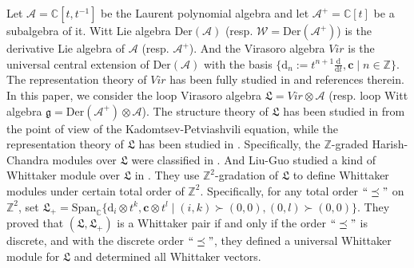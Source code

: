 \documentclass[12pt, a4paper]{amsart}
\newcommand{\C}{\mathbb{C}}
\newcommand{\Z}{\mathbb Z}
\newcommand{\rd}{\mathrm{d}}
\theoremstyle{Theorem}
\theoremstyle{Theorem}
\numberwithin{equation}{section}
\begin{document}
Let $\mathcal{A}=\C[t,t^{-1}]$  be the Laurent polynomial
algebra and let $\mathcal{A}^{+}=\C[t]$ be a subalgebra of it.
Witt Lie algebra $\mathrm{Der}(\mathcal{A})$ (resp. $\mathcal{W}=\mathrm{Der}(\mathcal{A}^{+})$)
is the derivative Lie algebra of $\mathcal{A}$ (resp. $\mathcal{A}^{+}$).
And the Virasoro algebra $Vir$ is the universal central extension of $\mathrm{Der}(\mathcal{A})$ with the basis
$\{\rd_{n}:=t^{n+1}\frac{\rd}{\rd t}, \bm{c}\mid n\in\Z\}$. The representation theory of $Vir$ has been
fully studied in \cite{Mat,MaP,MZ1,MZ2} and references therein. In this paper, we consider
the loop Virasoro algebra $\mathfrak{L}=Vir\otimes\mathcal{A}$
(resp. loop Witt algebra $\mathfrak{g}=\mathrm{Der}(\mathcal{A}^{+})\otimes\mathcal{A}$).
The structure theory of $\mathfrak{L}$ has been studied
in \cite{OR} from the point of view of the Kadomtsev-Petviashvili equation,
while the representation theory of $\mathfrak{L}$ has been studied in \cite{GLZ,LG}. Specifically,
the $\Z$-graded Harish-Chandra modules over $\mathfrak{L}$ were classified in \cite{GLZ}.
And Liu-Guo studied a kind of Whittaker module over $\mathfrak{L}$ in \cite{LG}.
They use $\Z^{2}$-gradation of $\mathfrak{L}$ to define Whittaker modules under certain total order of $\Z^{2}$.
Specifically, for any total order $``\preceq"$ on $\Z^{2}$, set
$\mathfrak{L}_{+}=\text{Span}_{\C}\{\rd_{i}\otimes t^{k},
\bm{c}\otimes t^{l}\mid (i,k)\succ(0,0), (0,l)\succ(0,0)\}$. They proved that
$(\mathfrak{L},\mathfrak{L}_{+})$ is a Whittaker pair if and only if
the order $``\preceq"$ is discrete, and with the discrete order $``\preceq"$,
they defined a universal Whittaker module for $\mathfrak{L}$ and determined all Whittaker vectors.
\end{document}
